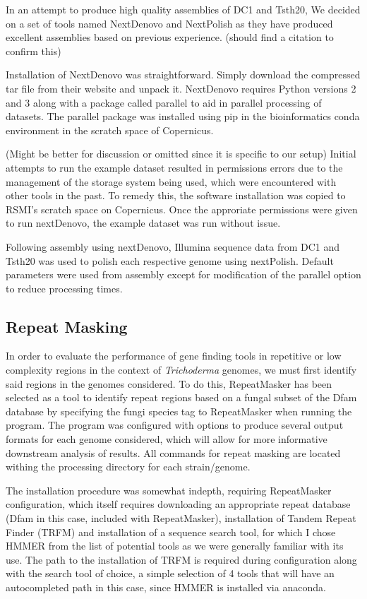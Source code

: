 \documentclass[12pt]{article}
\begin{document}
In an attempt to produce high quality assemblies of DC1 and Tsth20, We
decided on a set of tools named NextDenovo and NextPolish as they have
produced excellent assemblies based on previous experience. (should
find a citation to confirm this)

Installation of NextDenovo was straightforward. Simply download the
compressed tar file from their website and unpack it. NextDenovo
requires Python versions 2 and 3 along with a package called parallel
to aid in parallel processing of datasets. The parallel package was
installed using pip in the bioinformatics conda environment in the
scratch space of Copernicus.

(Might be better for discussion or omitted since it is specific to our
setup) Initial attempts to run the example dataset resulted in
permissions errors due to the management of the storage system being
used, which were encountered with other tools in the past. To remedy
this, the software installation was copied to RSMI's scratch space on
Copernicus. Once the approriate permissions were given to run
nextDenovo, the example dataset was run without issue.

Following assembly using nextDenovo, Illumina sequence data from DC1
and Tsth20 was used to polish each respective genome using
nextPolish. Default parameters were used from assembly except for
modification of the parallel option to reduce processing times.

\subsection{Repeat Masking}

In order to evaluate the performance of gene finding tools in
repetitive or low complexity regions in the context of
\textit{Trichoderma} genomes, we must first identify said regions in
the genomes considered. To do this, RepeatMasker has been selected as
a tool to identify repeat regions based on a fungal subset of the Dfam
database by specifying the fungi species tag to RepeatMasker when
running the program. The program was configured with options to
produce several output formats for each genome considered, which will
allow for more informative downstream analysis of results. All
commands for repeat masking are located withing the processing
directory for each strain/genome.

The installation procedure was somewhat indepth, requiring
RepeatMasker configuration, which itself requires downloading an
appropriate repeat database (Dfam in this case, included with
RepeatMasker), installation of Tandem Repeat Finder (TRFM) and
installation of a sequence search tool, for which I chose HMMER from
the list of potential tools as we were generally familiar with its
use. The path to the installation of TRFM is required during
configuration along with the search tool of choice, a simple selection
of 4 tools that will have an autocompleted path in this case, since
HMMER is installed via anaconda.
\end{document}
